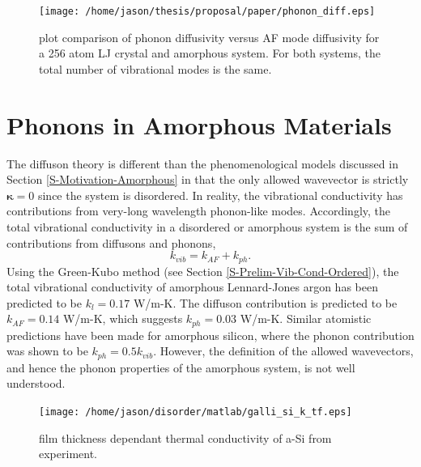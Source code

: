 \documentclass[aps,prb,preprint,superscriptaddress,amsmath,amssymb,floatfix]{revtex4}
\begin{document}
\begin{figure}
\begin{center}
\texttt{[image: /home/jason/thesis/proposal/paper/phonon\_diff.eps]}
\vspace*{-5mm}
\end{center}
\caption{\label{FIG:phonon_diff} plot comparison of phonon diffusivity 
versus AF mode diffusivity for a 256 atom LJ crystal and amorphous system. 
For both systems, the total number of vibrational modes is the same.}
\end{figure}

\section{\label{S-Prelim-Phonons-Amor}Phonons in Amorphous Materials }
The diffuson theory is different than the phenomenological models 
discussed in Section \ref{S-Motivation-Amorphous} in that the only 
allowed wavevector is strictly $\mathbf{\kappa}= 0$ since the system is 
disordered. In reality, the vibrational conductivity has contributions 
from very-long wavelength phonon-like modes. Accordingly, the total 
vibrational conductivity in a disordered or amorphous system is the sum of 
contributions from diffusons and phonons,
\begin{equation}\label{EQ:M:k_thermal}
k_{vib} = k_{AF} + k_{ph}.
\end{equation}
Using the Green-Kubo method (see Section \ref{S-Prelim-Vib-Cond-Ordered}), 
the total vibrational conductivity of amorphous Lennard-Jones argon has 
been predicted to be $k_{l}=0.17$ W/m-K. The diffuson contribution is 
predicted to be $k_{AF} = 0.14$ W/m-K, which suggests 
$k_{ph} = 0.03$ W/m-K. Similar atomistic predictions have been made for 
amorphous silicon, where the phonon contribution was shown to be 
$k_{ph} = 0.5k_{vib}$.\cite{He2011a} However, the definition of the 
allowed wavevectors, and hence the phonon properties of the amorphous 
system, is not well understood.\cite{He2011a}
\begin{figure}
\begin{center}
\texttt{[image: /home/jason/disorder/matlab/galli\_si\_k\_tf.eps]}
\vspace*{-5mm}
\end{center}
\caption{\label{FIG:phonon_diff} film thickness dependant thermal 
conductivity of a-Si from experiment.}
\end{figure}
\end{document}
